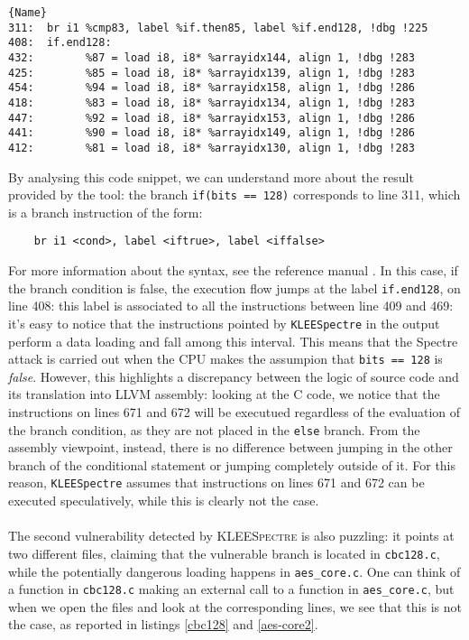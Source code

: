 \documentclass[12pt,a4paper]{book}
\theoremstyle{definition}
\begin{document}
	\lstset{numbers=none}
	\begin{lstlisting}[caption=\texttt{assembly.ll} (for AES-CBC), label=asm1]{Name}
311:  br i1 %cmp83, label %if.then85, label %if.end128, !dbg !225
408:  if.end128:                                        
432:  		%87 = load i8, i8* %arrayidx144, align 1, !dbg !283
425:  		%85 = load i8, i8* %arrayidx139, align 1, !dbg !283
454:  		%94 = load i8, i8* %arrayidx158, align 1, !dbg !286
418:  		%83 = load i8, i8* %arrayidx134, align 1, !dbg !283
447:  		%92 = load i8, i8* %arrayidx153, align 1, !dbg !286
441:  		%90 = load i8, i8* %arrayidx149, align 1, !dbg !286
412:  		%81 = load i8, i8* %arrayidx130, align 1, !dbg !283
	\end{lstlisting}
	\vspace{3mm}
	
	By analysing this code snippet, we can understand more about the result provided by the tool: the branch \texttt{if(bits == 128)} corresponds to line 311, which is a branch instruction of the form:
	
	\begin{lstlisting}
	br i1 <cond>, label <iftrue>, label <iffalse>
	\end{lstlisting}

	For more information about the syntax, see the reference manual \cite{LLVMasm}. In this case, if the branch condition is false, the execution flow jumps at the label \texttt{if.end128}, on line 408: this label is associated to all the instructions between line 409 and 469: it's easy to notice that the instructions pointed by \texttt{KLEESpectre} in the output perform a data loading and fall among this interval. This means that the Spectre attack is carried out when the CPU makes the assumpion that \texttt{bits == 128} is \textit{false}. However, this highlights a discrepancy between the logic of source code and its translation into LLVM assembly: looking at the C code, we notice that the instructions on lines 671 and 672 will be executued regardless of the evaluation of the branch condition, as they are not placed in the \texttt{else} branch. From the assembly viewpoint, instead, there is no difference between jumping in the other branch of the conditional statement or jumping completely outside of it. For this reason, \texttt{KLEESpectre} assumes that instructions on lines 671 and 672 can be executed speculatively, while this is clearly not the case.
	\paragraph{}The second vulnerability detected by \textsc{KLEESpectre} is also puzzling: it points at two different files, claiming that the vulnerable branch is located in \texttt{cbc128.c}, while the potentially dangerous loading happens in \texttt{aes\_core.c}. One can think of a function in \texttt{cbc128.c} making an external call to a function in \texttt{aes\_core.c}, but when we open the files and look at the corresponding lines, we see that this is not the case, as reported in listings \ref{cbc128} and \ref{aes-core2}.
	
\end{document}
